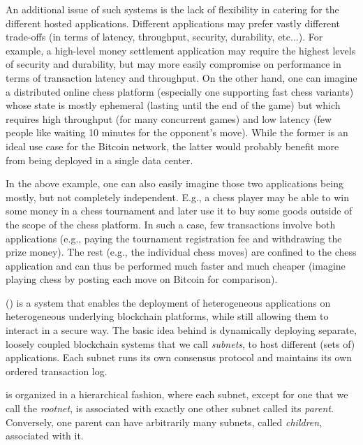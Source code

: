 An additional issue of such systems is the lack of flexibility in catering for the different hosted applications.
Different applications may prefer vastly different trade-offs (in terms of latency, throughput, security, durability, etc...).
For example, a high-level money settlement application may require the highest levels of security and durability, but may more easily compromise on performance in terms of transaction latency and throughput.
On the other hand, one can imagine a distributed online chess platform (especially one supporting fast chess variants) whose state is mostly ephemeral (lasting until the end of the game) but which requires high throughput (for many concurrent games) and low latency (few people like waiting 10 minutes for the opponent's move).
While the former is an ideal use case for the Bitcoin network, the latter would probably benefit more from being deployed in a single data center.

In the above example, one can also easily imagine those two applications being mostly, but not completely independent.
E.g., a chess player may be able to win some money in a chess tournament and later use it to buy some goods outside of the scope of the chess platform.
In such a case, few transactions involve both applications (e.g., paying the tournament registration fee and withdrawing the prize money).
The rest (e.g., the individual chess moves) are confined to the chess application and can thus be performed much faster and much cheaper (imagine playing chess by posting each move on Bitcoin for comparison).

\ipcFull (\ipc) is a system that enables the deployment of heterogeneous applications on heterogeneous underlying blockchain platforms, while still allowing them to interact in a secure way.
The basic idea behind \ipc is dynamically deploying separate, loosely coupled blockchain systems that we call \emph{subnets}, to host different (sets of) applications.
Each subnet runs its own consensus protocol and maintains its own ordered transaction log.

\ipc is organized in a hierarchical fashion, where each subnet, except for one that we call the \emph{rootnet}, is associated with exactly one other subnet called its \emph{parent}.
Conversely, one parent can have arbitrarily many subnets, called \emph{children}, associated with it.

